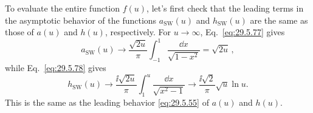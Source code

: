 To evaluate the entire function \(f(u)\), let's first check that the leading
terms in the asymptotic behavior of the functions \(a_{\mathrm{SW}}(u)\) and
\(h_{\mathrm{SW}}(u)\) are the same as those of \(a(u)\) and \(h(u)\),
respectively. For \(u\longrightarrow\infty\), Eq.~\eqref{eq:29.5.77} gives
\begin{equation}
  a_{\mathrm{SW}}(u)
  \longrightarrow\frac{\sqrt{2u}}{\pi}\int_{-1}^{1}
    \frac{\dd x}{\sqrt{1-x^2}}
  =\sqrt{2u}\,,
  \tag{29.5.84}\label{eq:29.5.84}
\end{equation}
while Eq.~\eqref{eq:29.5.78} gives
\begin{equation}
  h_{\mathrm{SW}}(u)
  \longrightarrow\frac{\ii\sqrt{2u}}{\pi}\int_1^u
    \frac{\dd x}{\sqrt{x^2-1}}
  \longrightarrow\frac{\ii\sqrt{2}}{\pi}\sqrt{u}\ln u.
  \tag{29.5.85}\label{eq:29.5.85}
\end{equation}
This is the same as the leading behavior \eqref{eq:29.5.55} of \(a(u)\) and
\(h(u)\).

